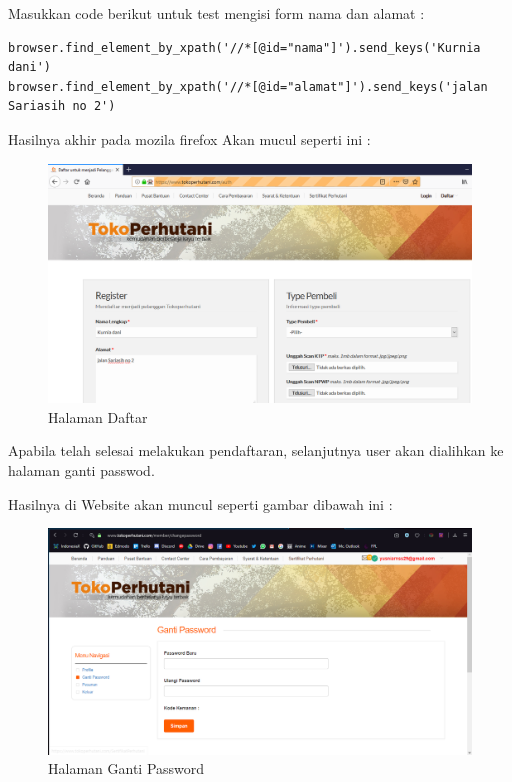 Masukkan code berikut untuk test mengisi form nama dan alamat :
\begin{verbatim}
browser.find_element_by_xpath('//*[@id="nama"]').send_keys('Kurnia dani')
browser.find_element_by_xpath('//*[@id="alamat"]').send_keys('jalan Sariasih no 2')
\end{verbatim}

Hasilnya akhir pada mozila firefox Akan mucul seperti ini :
\begin{figure}[h]
	\centering
	\includegraphics[scale=0.25]{figures/4daftar}
	\caption{Halaman Daftar}
\end{figure}


Apabila telah selesai melakukan pendaftaran, selanjutnya user akan dialihkan ke halaman ganti passwod.

Hasilnya di Website akan muncul seperti gambar dibawah ini :
\begin{figure}[h]
	\centering
	\includegraphics[scale=0.25]{figures/T2Login}
	\caption{Halaman Ganti Password}
\end{figure}
















